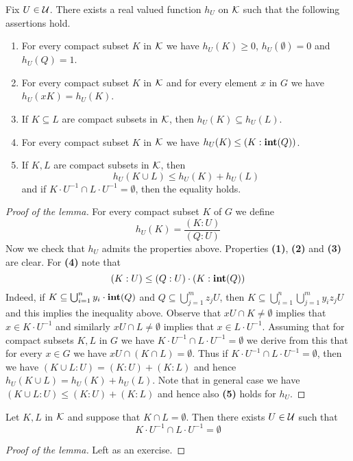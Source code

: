 \begin{lemma}\label{lemma:approximationoncompactsets}
Fix $U\in {\mathcal U}$. There exists a real valued function $h_U$ on ${\mathcal K}$ such that the following assertions hold.
\begin{enumerate}[label=\emph{\textbf{(\arabic*)}}, leftmargin=1.5em]
\item For every compact subset $K$ in ${\mathcal K}$ we have $h_U(K)\geq 0$, $h_U(\emptyset) = 0$ and $h_U(Q)=1$.
\item For every compact subset $K$ in ${\mathcal K}$ and for every element $x$ in $G$ we have $h_U(xK) = h_U(K)$.
\item If $K\subseteq L$ are compact subsets in ${\mathcal K}$, then $h_U(K)\subseteq h_U(L)$.
\item For every compact subset $K$ in ${\mathcal K}$ we have $h_U(K) \leq \left(K:\mathbf{int}(Q)\right)$.
\item If $K, L$ are compact subsets in ${\mathcal K}$, then
$$h_U(K\cup L) \leq h_U(K) + h_U(L)$$
and if $K\cdot U^{-1}\cap L\cdot U^{-1} = \emptyset$, then the equality holds.
\end{enumerate}
\end{lemma}
\begin{proof}[Proof of the lemma]
For every compact subset $K$ of $G$ we define
$$h_U(K) = \frac{(K:U)}{(Q:U)}$$
Now we check that $h_U$ admits the properties above. Properties \textbf{(1)}, \textbf{(2)} and \textbf{(3)} are clear. For \textbf{(4)} note that
$$(K:U) \leq (Q:U)\cdot\left(K:\mathbf{int}(Q)\right)$$
Indeed, if $K\subseteq \bigcup_{i=1}^ny_i\cdot \mathbf{int}(Q)$ and $Q\subseteq \bigcup_{j=1}^mz_jU$, then $K\subseteq \bigcup_{i=1}^n\bigcup_{j=1}^my_iz_jU$ and this implies the inequality above. Observe that $xU \cap K \neq \emptyset$ implies that $x\in K\cdot U^{-1}$ and similarly $xU\cap L\neq \emptyset$ implies that $x\in L\cdot U^{-1}$. Assuming that for compact subsets $K, L$ in $G$ we have $ K\cdot U^{-1}\cap L\cdot U^{-1} = \emptyset$ we derive from this that for every $x\in G$ we have $xU\cap \left(K\cap L\right) = \emptyset$. Thus if $K\cdot U^{-1}\cap L\cdot U^{-1} = \emptyset$, then we have $(K\cup L:U) = (K:U)+(K:L)$ and hence $h_U(K\cup L) = h_U(K)+h_U(L)$. Note that in general case we have $(K\cup L:U) \leq (K:U)+(K:L)$ and hence also \textbf{(5)} holds for $h_U$.
\end{proof}

\begin{lemma}\label{lemma:compactsetsareseparablebyopens}
Let $K, L$ in ${\mathcal K}$ and suppose that $K\cap L =\emptyset$. Then there exists $U\in {\mathcal U}$ such that
$$K\cdot U^{-1}\cap L\cdot U^{-1} = \emptyset$$
\end{lemma}
\begin{proof}[Proof of the lemma]
Left as an exercise.
\end{proof}

